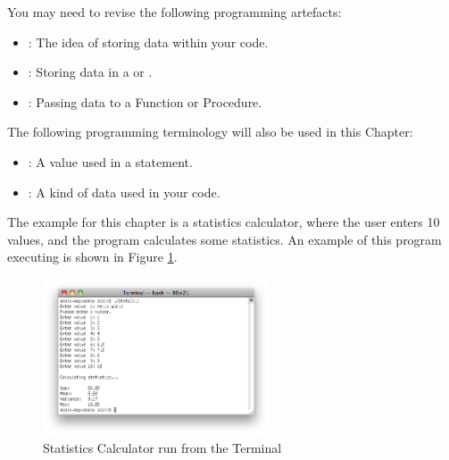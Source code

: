 \bigskip

You may need to revise the following programming artefacts:
\begin{itemize}
  \item {}: The idea of storing data within your code.
  \item {}: Storing data in a  or .
  \item {}: Passing data to a Function or Procedure.
\end{itemize}

The following programming terminology will also be used in this Chapter:
\begin{itemize}
  \item {}: A value used in a statement.
  \item {}: A kind of data used in your code.
\end{itemize}

The example for this chapter is a statistics calculator, where the user enters 10 values, and the program calculates some statistics. An example of this program executing is shown in Figure \ref{fig:simple-stats}.

\begin{figure}[h]
   \centering
   \includegraphics[width=0.6\textwidth]{./topics/arrays/images/SimpleStats} 
   \caption[Statistics Calculator Terminal]{Statistics Calculator run from the Terminal}
   \label{fig:simple-stats}
\end{figure}











